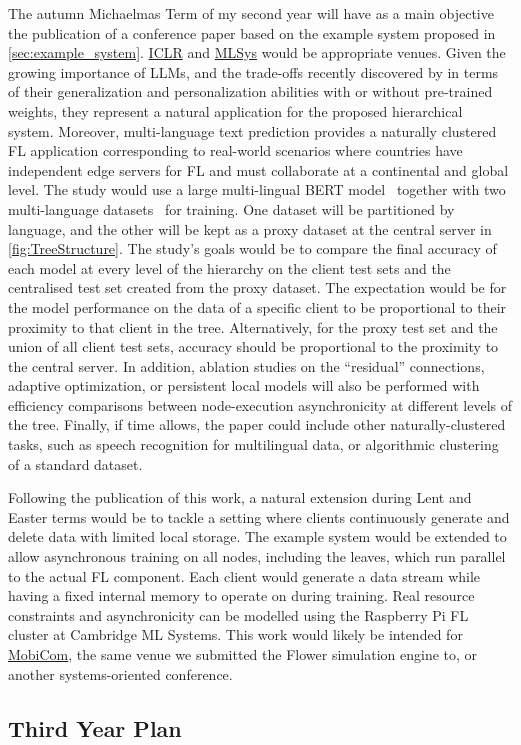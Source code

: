 The autumn Michaelmas Term of my second year will have as a main objective the publication of a conference paper based on the example system proposed in \cref{sec:example_system}. \href{https://iclr.cc/}{ICLR} and \href{https://mlsys.org/}{MLSys} would be appropriate venues. Given the growing importance of LLMs, and the trade-offs recently discovered by \citet{PersonalisationGeneralisationTradeoff} in terms of their generalization and personalization abilities with or without pre-trained weights, they represent a natural application for the proposed hierarchical system. Moreover, multi-language text prediction provides a naturally clustered FL application corresponding to real-world scenarios where countries have independent edge servers for FL and must collaborate at a continental and global level. The study would use a large multi-lingual BERT model~\citep{RoBERTA} together with two multi-language datasets~\citep[e.g., ][]{XGLUE,mC4} for training. One dataset will be partitioned by language, and the other will be kept as a proxy dataset at the central server in \cref{fig:TreeStructure}. The study's goals would be to compare the final accuracy of each model at every level of the hierarchy on the client test sets and the centralised test set created from the proxy dataset. The expectation would be for the model performance on the data of a specific client to be proportional to their proximity to that client in the tree. Alternatively, for the proxy test set and the union of all client test sets, accuracy should be proportional to the proximity to the central server. In addition, ablation studies on the ``residual'' connections, adaptive optimization, or persistent local models will also be performed with efficiency comparisons between node-execution asynchronicity at different levels of the tree.   Finally, if time allows, the paper could include other naturally-clustered tasks, such as speech recognition for multilingual data, or algorithmic clustering of a standard dataset.

Following the publication of this work, a natural extension during Lent and Easter terms would be to tackle a setting where clients continuously generate and delete data with limited local storage. The example system would be extended to allow asynchronous training on all nodes, including the leaves, which run parallel to the actual FL component. Each client would generate a data stream while having a fixed internal memory to operate on during training. Real resource constraints and asynchronicity can be modelled using the Raspberry Pi FL cluster at Cambridge ML Systems. This work would likely be intended for \href{https://sigmobile.org/mobicom/2023/}{MobiCom}, the same venue we submitted the Flower simulation engine to, or another systems-oriented conference.

\subsection{Third Year Plan}

